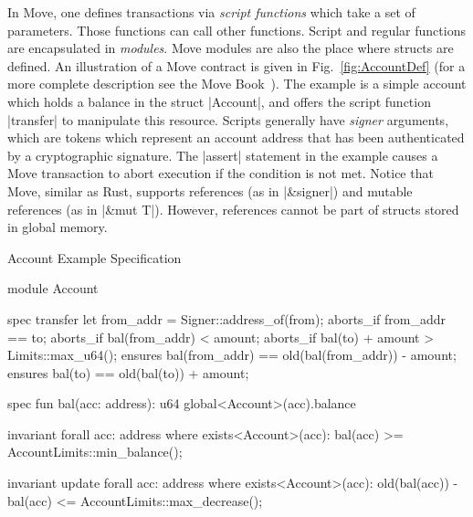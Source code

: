 \noindent In Move, one defines transactions via \emph{script functions} which
take a set of parameters.  Those functions can call other functions. Script and
regular functions are encapsulated in \emph{modules}. Move modules are also the
place where structs are defined. An illustration of a Move contract is given in
Fig.~\ref{fig:AccountDef} (for a more complete description see the Move
Book~\cite{MOVE_LANG}). The example is a simple account which holds a balance in
the struct |Account|, and offers the script function |transfer| to manipulate
this resource.  Scripts generally have \emph{signer} arguments, which are tokens
which represent an account address that has been authenticated by a
cryptographic signature.  The |assert| statement in the example causes a Move
transaction to abort execution if the condition is not met. Notice that Move,
similar as Rust, supports references (as in |&signer|) and mutable references
(as in |&mut T|).  However, references cannot be part of structs stored in
global memory.



\begin{Figure}
\caption{\label{fig:AccountSpec} Account Example Specification}
\begin{MoveBox}
module Account {
  spec transfer {
    let from_addr = Signer::address_of(from);
    aborts_if from_addr == to;
    aborts_if bal(from_addr) < amount;
    aborts_if bal(to) + amount > Limits::max_u64();
    ensures bal(from_addr) == old(bal(from_addr)) - amount;
    ensures bal(to) == old(bal(to)) + amount;
  }

  spec fun bal(acc: address): u64 {
    global<Account>(acc).balance
  }

  invariant forall acc: address where exists<Account>(acc):
    bal(acc) >= AccountLimits::min_balance();

  invariant update forall acc: address where exists<Account>(acc):
    old(bal(acc)) - bal(acc) <= AccountLimits::max_decrease();
}
\end{MoveBox}
\end{Figure}

